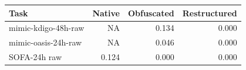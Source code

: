 \begin{tabular}{lrrr}
\toprule
Task & Native & Obfuscated & Restructured \\
\midrule
mimic-kdigo-48h-raw & NA & 0.134 & 0.000 \\
mimic-oasis-24h-raw & NA & 0.046 & 0.000 \\
SOFA-24h raw & 0.124 & 0.000 & 0.000 \\
\bottomrule
\end{tabular}
